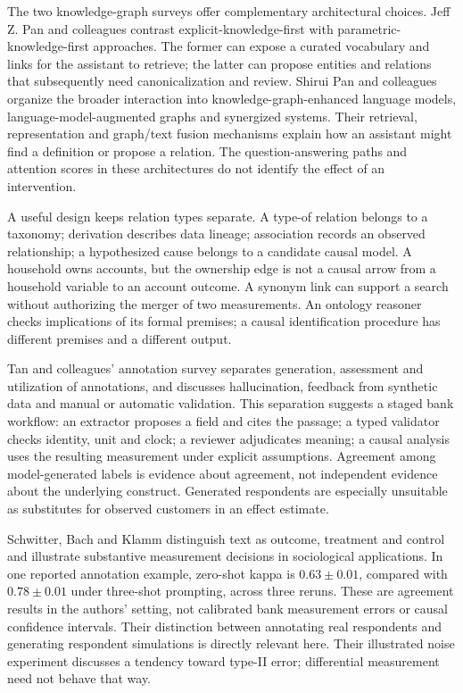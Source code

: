 The two knowledge-graph surveys offer complementary architectural choices.
Jeff Z. Pan and colleagues contrast explicit-knowledge-first with
parametric-knowledge-first approaches. The former can expose a curated
vocabulary and links for the assistant to retrieve; the latter can propose
entities and relations that subsequently need canonicalization and
review.\citep{exec17_ontology_kg_challenges} Shirui Pan and colleagues organize
the broader interaction into knowledge-graph-enhanced language models,
language-model-augmented graphs and synergized systems. Their retrieval,
representation and graph/text fusion mechanisms explain how an assistant might
find a definition or propose a relation.\citep{exec17_ontology_kg_roadmap}
The question-answering paths and attention scores in these architectures do
not identify the effect of an intervention.

A useful design keeps relation types separate. A type-of relation
belongs to a taxonomy; derivation describes data lineage; association
records an observed relationship; a hypothesized cause belongs to a
candidate causal model. A household owns accounts, but the ownership edge is
not a causal arrow from a household variable to an account outcome. A synonym
link can support a search without authorizing the merger of two measurements.
An ontology reasoner checks implications of its formal premises; a causal
identification procedure has different premises and a different output.

Tan and colleagues' annotation survey separates generation, assessment and
utilization of annotations, and discusses hallucination, feedback from
synthetic data and manual or automatic validation.\citep{exec17_ontology_annotation}
This separation suggests a staged bank workflow: an extractor proposes a
field and cites the passage; a typed validator checks identity, unit and
clock; a reviewer adjudicates meaning; a causal analysis uses the resulting
measurement under explicit assumptions. Agreement among model-generated
labels is evidence about agreement, not independent evidence about the
underlying construct. Generated respondents are especially unsuitable as
substitutes for observed customers in an effect estimate.

Schwitter, Bach and Klamm distinguish text as outcome, treatment and control
and illustrate substantive measurement decisions in sociological
applications. In one reported annotation example, zero-shot kappa is
\(0.63\pm0.01\), compared with \(0.78\pm0.01\) under three-shot prompting,
across three reruns. These are agreement results in the authors' setting,
not calibrated bank measurement errors or causal confidence intervals.
Their distinction between annotating real respondents and generating
respondent simulations is directly relevant here. Their illustrated noise
experiment discusses a tendency toward type-II error; differential
measurement need not behave that way.\citep{exec17_ontology_sociology}

